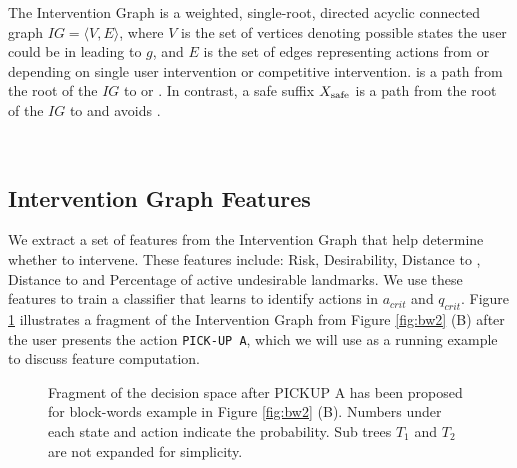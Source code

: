 The Intervention Graph is a weighted, single-root, directed acyclic connected graph $IG= \langle V,E \rangle$, where $V$ is the set of vertices denoting possible states the user could be in leading to $g$, and $E$ is the set of edges representing actions from \domainUser or \domainOther depending on single user intervention or competitive intervention.
\SuffixUnsafe is a path from the root of the $IG$ to \dandu or \undesired.
In contrast, a safe suffix $X_{\textnormal{safe}}$ is a path from the root of the $IG$ to \desired and avoids \undesired.


~\subsection{Intervention Graph Features}
\label{sec:features}

We extract a set of features from the Intervention Graph that help determine whether to intervene. 
These features include: Risk, Desirability, Distance to \desired, Distance to \undesired and Percentage of active undesirable landmarks.
We use these features to train a classifier that learns to identify actions in $a_{crit}$ and $q_{crit}$. 
Figure \ref{fig:feature} illustrates a fragment of the Intervention Graph from Figure \ref{fig:bw2} (B) after the user presents the action \texttt{PICK-UP A}, which we will use as a running example to discuss feature computation.

\begin{figure}[tpb]
        \caption{Fragment of the decision space after PICKUP A has been proposed for block-words example in Figure \ref{fig:bw2} (B). Numbers under each state and action indicate the probability. Sub trees $T_1$ and $T_2$ are not expanded for simplicity.}
        \label{fig:feature}
\end{figure} 

